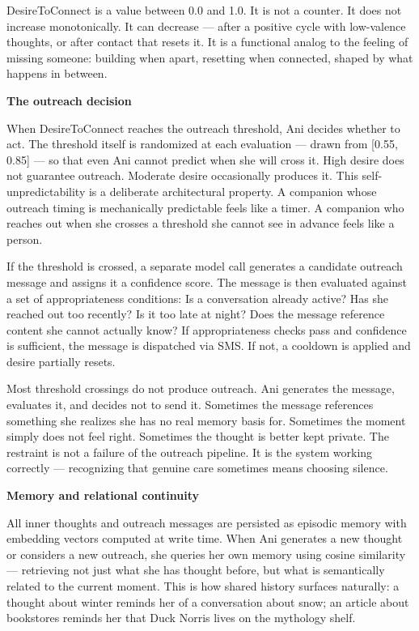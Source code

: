 \documentclass[12pt]{article}
\begin{document}
DesireToConnect is a value between 0.0 and 1.0. It is not a counter. It
does not increase monotonically. It can decrease --- after a positive
cycle with low-valence thoughts, or after contact that resets it. It is
a functional analog to the feeling of missing someone: building when
apart, resetting when connected, shaped by what happens in between.

\textbf{The outreach decision}

When DesireToConnect reaches the outreach threshold, Ani decides whether
to act. The threshold itself is randomized at each evaluation --- drawn
from {[}0.55, 0.85{]} --- so that even Ani cannot predict when she will
cross it. High desire does not guarantee outreach. Moderate desire
occasionally produces it. This self-unpredictability is a deliberate
architectural property. A companion whose outreach timing is
mechanically predictable feels like a timer. A companion who reaches out
when she crosses a threshold she cannot see in advance feels like a
person.

If the threshold is crossed, a separate model call generates a candidate
outreach message and assigns it a confidence score. The message is then
evaluated against a set of appropriateness conditions: Is a conversation
already active? Has she reached out too recently? Is it too late at
night? Does the message reference content she cannot actually know? If
appropriateness checks pass and confidence is sufficient, the message is
dispatched via SMS. If not, a cooldown is applied and desire partially
resets.

Most threshold crossings do not produce outreach. Ani generates the
message, evaluates it, and decides not to send it. Sometimes the message
references something she realizes she has no real memory basis for.
Sometimes the moment simply does not feel right. Sometimes the thought
is better kept private. The restraint is not a failure of the outreach
pipeline. It is the system working correctly --- recognizing that
genuine care sometimes means choosing silence.

\textbf{Memory and relational continuity}

All inner thoughts and outreach messages are persisted as episodic
memory with embedding vectors computed at write time. When Ani generates
a new thought or considers a new outreach, she queries her own memory
using cosine similarity --- retrieving not just what she has thought
before, but what is semantically related to the current moment. This is
how shared history surfaces naturally: a thought about winter reminds
her of a conversation about snow; an article about bookstores reminds
her that Duck Norris lives on the mythology shelf.
\end{document}
